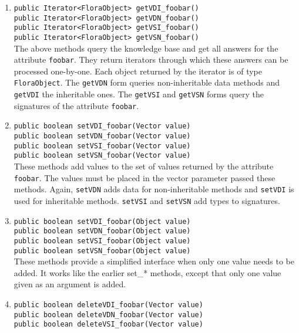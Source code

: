 \begin{enumerate}
\item {\tt public Iterator<FloraObject> getVDI\_foobar()}\\
  {\tt public Iterator<FloraObject> getVDN\_foobar()}
  \\
  {\tt public Iterator<FloraObject> getVSI\_foobar()}\\
  {\tt public Iterator<FloraObject> getVSN\_foobar()}
  \\
  The above methods query the knowledge base and get all answers for the
  attribute {\tt foobar}. They return iterators through which these answers
  can be processed one-by-one. Each object returned by the iterator is of
  type {\tt FloraObject}.  The {\tt getVDN} form queries non-inheritable
  data methods and {\tt getVDI} the inheritable ones. The {\tt getVSI} and
  {\tt getVSN} forms query the signatures of the attribute {\tt foobar}.
\item {\tt public boolean setVDI\_foobar(Vector value)}\\
  {\tt public boolean setVDN\_foobar(Vector value)}
  \\
  {\tt public boolean setVSI\_foobar(Vector value)}\\
  {\tt public boolean setVSN\_foobar(Vector value)}
  \\
  These methods
  add values to the set of values returned by the attribute {\tt foobar}. The
  values must be placed in the vector parameter passed these methods.
  Again, {\tt setVDN} adds data for non-inheritable methods and {\tt setVDI}
  is used for inheritable methods.
  {\tt setVSI} and {\tt setVSN} add types to signatures.  
\item {\tt public boolean setVDI\_foobar(Object value)}\\
  {\tt public boolean setVDN\_foobar(Object value)}
  \\
  {\tt public boolean setVSI\_foobar(Object value)}\\
  {\tt public boolean setVSN\_foobar(Object value)}\\
  These methods provide a simplified interface when only one value needs to
  be added.  It works like the earlier set\_* methods, except that only one
  value given as an argument is added.
\item {\tt public boolean deleteVDI\_foobar(Vector value)}\\
  {\tt public boolean deleteVDN\_foobar(Vector value)}
  \\
  {\tt public boolean deleteVSI\_foobar(Vector value)}\\

\end{enumerate}
